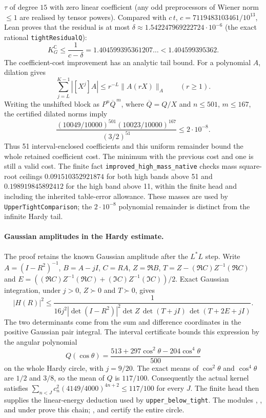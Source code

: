 \documentclass[11pt,a4paper]{article}
\newcommand{\C}{\mathbb{C}}
\newcommand{\KG}{K_G^{\C}}
\newcommand{\lean}[1]{\texttt{\small #1}}
\begin{document}
$\tau$ of degree $15$ with zero linear coefficient (any odd preprocessors of Wiener norm $\le1$ are realised by tensor
powers). Compared with $c\,t$, $c=7119483103461/10^{13}$, Lean proves that the residual is at most
$\delta\approx1.542247969222724\cdot10^{-6}$
(the exact rational \lean{tightResidualQ}):
\[
 \KG\le\frac1{c-\delta}=1.404599395361207\ldots<1.404599395362 .
\]
The coefficient-cost improvement has an analytic tail bound. For a polynomial
$A$, dilation gives
\[
 \sum_{j=L}^{K-1}|[X^j]A|
 \le r^{-L}\|A(rX)\|_A \qquad(r\ge1).
\]
Writing the unshifted block as $P^n\overline Q^{\,m}$, where
$\overline Q=Q/X$ and $n\le501$, $m\le167$, the certified dilated norms imply
\[
 \frac{(10049/10000)^{501}(10023/10000)^{167}}{(3/2)^{51}}
 \le 2\cdot10^{-8}.
\]
Thus 51 interval-enclosed coefficients and this uniform remainder bound the
whole retained coefficient cost. The minimum with the previous cost and one
is still a valid cost. The finite fact \lean{improved\_high\_mass\_native}
checks mass square-root ceilings $0.091510352921874$ for both high bands above
51 and $0.198919845892412$ for the high band above 11, within the finite head
and including the inherited table-error allowance. These masses are used by \lean{UpperTightComparison};
the $2\cdot10^{-8}$ polynomial remainder is distinct from the infinite Hardy tail.

\paragraph{Gaussian amplitudes in the Hardy estimate.}
The proof retains the known Gaussian amplitude after the $L^*L$ step.
Write $A=(I-R^2)^{-1}$, $B=A-jI$, $C=RA$, $Z=\Re B$,
$T=Z-(\Re C)Z^{-1}(\Re C)$ and
$E=((\Re C)Z^{-1}(\Re C)+(\Im C)Z^{-1}(\Im C))/2$.
Exact Gaussian integration, under $j>0$, $Z\succ0$ and $T\succ0$, gives
\[
 |H(R)|^2\le
 \frac{1}{16j^2|\det(I-R^2)|^2\det Z\,\det(T+jI)\,\det(T+2E+jI)}.
\]
The two determinants come from the sum and difference coordinates in the
positive Gaussian pair integral. The interval certificate bounds this
expression by the angular polynomial
\[
 Q(\cos\theta)=\frac{513+297\cos^2\theta-204\cos^4\theta}{500}
\]
on the whole Hardy circle, with $j=9/20$. The exact means of $\cos^2\theta$
and $\cos^4\theta$ are $1/2$ and $3/8$, so the mean of $Q$ is $117/100$.
Consequently the actual kernel satisfies
$\sum_{n<J}c_n^2(4149/4000)^{4n+2}\le117/100$ for every $J$.
The finite head then supplies the linear-energy deduction used by
\lean{upper\_below\_tight}. The modules ,
,  and
 under  prove this chain;
,  and
 certify the entire circle.
\end{document}

